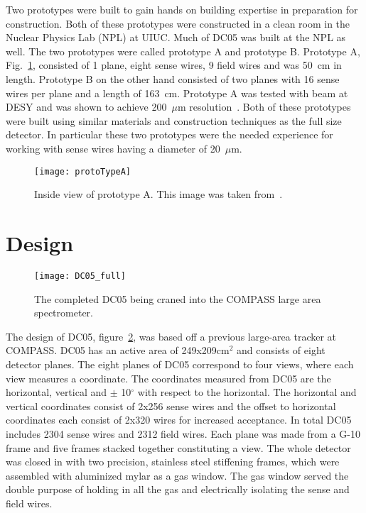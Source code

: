 Two prototypes were built to gain hands on building expertise in preparation for
construction.  Both of these prototypes were constructed in a clean room in the
Nuclear Physics Lab (NPL) at UIUC.  Much of DC05 was built at the NPL as well.
The two prototypes were called prototype A and prototype B.  Prototype A,
Fig.~\ref{fig::protoTypeA}, consisted of 1 plane, eight sense wires, 9 field
wires and was 50~cm in length.  Prototype B on the other hand consisted of two
planes with 16 sense wires per plane and a length of 163~cm.  Prototype A was
tested with beam at DESY and was shown to achieve 200~$\mu$m
resolution~\cite{choi}.  Both of these prototypes were built using similar
materials and construction techniques as the full size detector.  In particular
these two prototypes were the needed experience for working with sense wires
having a diameter of 20~$\mu$m.

\begin{figure}[h!t]
  \centering \texttt{[image: protoTypeA]}
  \caption{Inside view of prototype A.  This image was taken from~\cite{choi}. }
  \label{fig::protoTypeA}
\end{figure}


\section{Design}

\begin{figure}
  \centering \texttt{[image: DC05\_full]}
  \caption{The completed DC05 being craned into the COMPASS large area
    spectrometer.}
  \label{fig:DC05}%
\end{figure}

The design of DC05, figure~\ref{fig:DC05}, was based off a previous large-area
tracker at COMPASS.  DC05 has an active area of 249x209cm$^2$ and consists of
eight detector planes.  The eight planes of DC05 correspond to four views, where
each view measures a coordinate.  The coordinates measured from DC05 are the
horizontal, vertical and $\pm$ 10$^{\circ}$ with respect to the horizontal.  The
horizontal and vertical coordinates consist of 2x256 sense wires and the offset
to horizontal coordinates each consist of 2x320 wires for increased acceptance.
In total DC05 includes 2304 sense wires and 2312 field wires.  Each plane was
made from a G-10 frame and five frames stacked together constituting a view.
The whole detector was closed in with two precision, stainless steel stiffening
frames, which were assembled with aluminized mylar as a gas window.  The gas
window served the double purpose of holding in all the gas and electrically
isolating the sense and field wires.


